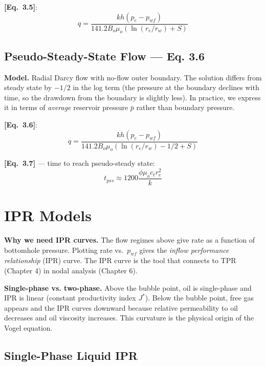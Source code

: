 \documentclass[11pt,a4paper,openany]{book}
\newcommand{\eqrefbook}[1]{\textcolor{blue!60!black}{\textbf{[Eq.~#1]}}}
\begin{document}
\eqrefbook{3.5}:
\begin{equation}
  q = \frac{kh(p_e - p_{wf})}{141.2 B_o\mu_o(\ln(r_e/r_w) + S)}
\end{equation}

\subsection{Pseudo-Steady-State Flow — Eq. 3.6}

\begin{theory}
\textbf{Model.} Radial Darcy flow with no-flow outer boundary. The
solution differs from steady state by $-1/2$ in the log term (the
pressure at the boundary declines with time, so the drawdown from the
boundary is slightly less). In practice, we express it in terms of
\emph{average} reservoir pressure $\bar{p}$ rather than boundary
pressure.
\end{theory}

\eqrefbook{3.6}:
\begin{equation}
  q = \frac{kh(p_e - p_{wf})}{141.2 B_o\mu_o(\ln(r_e/r_w) - 1/2 + S)}
\end{equation}

\eqrefbook{3.7} — time to reach pseudo-steady state:
\begin{equation}
  t_{pss} \approx 1200\frac{\phi\mu_o c_t r_e^2}{k}
\end{equation}

\section{IPR Models}

\begin{theory}
\textbf{Why we need IPR curves.} The flow regimes above give rate as
a function of bottomhole pressure. Plotting rate vs.\ $p_{wf}$ gives
the \emph{inflow performance relationship} (IPR) curve. The IPR curve
is the tool that connects to TPR (Chapter 4) in nodal analysis
(Chapter 6).

\textbf{Single-phase vs. two-phase.} Above the bubble point, oil is
single-phase and IPR is linear (constant productivity index $J^*$).
Below the bubble point, free gas appears and the IPR curves downward
because relative permeability to oil decreases and oil viscosity
increases. This curvature is the physical origin of the Vogel
equation.
\end{theory}

\subsection{Single-Phase Liquid IPR}
\end{document}
